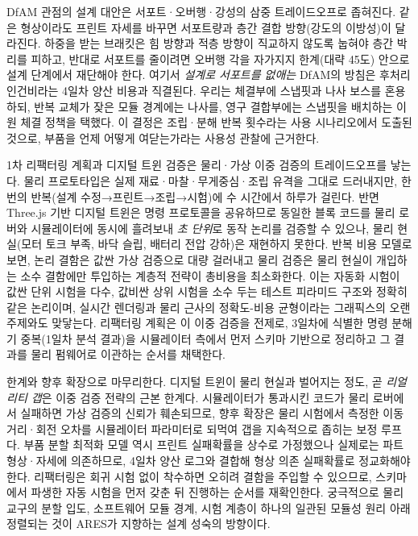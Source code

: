 DfAM 관점의 설계 대안은 서포트·오버행·강성의 삼중 트레이드오프로 좁혀진다. 같은 형상이라도 프린트 자세를 바꾸면 서포트량과 층간 결합 방향(강도의 이방성)이 달라진다. 하중을 받는 브래킷은 힘 방향과 적층 방향이 직교하지 않도록 눕혀야 층간 박리를 피하고, 반대로 서포트를 줄이려면 오버행 각을 자가지지 한계(대략 45도) 안으로 설계 단계에서 재단해야 한다. 여기서 \emph{설계로 서포트를 없애는} DfAM의 방침은 후처리 인건비라는 4일차 양산 비용과 직결된다. 우리는 체결부에 스냅핏과 나사 보스를 혼용하되, 반복 교체가 잦은 모듈 경계에는 나사를, 영구 결합부에는 스냅핏을 배치하는 이원 체결 정책을 택했다. 이 결정은 조립·분해 반복 횟수라는 사용 시나리오에서 도출된 것으로, 부품을 언제 어떻게 여닫는가라는 사용성 관찰\cite{norman2013design}에 근거한다.

1차 리팩터링 계획과 디지털 트윈 검증은 물리·가상 이중 검증의 트레이드오프를 낳는다. 물리 프로토타입은 실제 재료·마찰·무게중심·조립 유격을 그대로 드러내지만, 한 번의 반복(설계 수정→프린트→조립→시험)에 수 시간에서 하루가 걸린다. 반면 Three.js 기반 디지털 트윈\cite{threejs}은 명령 프로토콜을 공유하므로 동일한 블록 코드를 물리 로버와 시뮬레이터에 동시에 흘려보내 \emph{초 단위}로 동작 논리를 검증할 수 있으나, 물리 현실(모터 토크 부족, 바닥 슬립, 배터리 전압 강하)은 재현하지 못한다. 반복 비용 모델로 보면, 논리 결함은 값싼 가상 검증으로 대량 걸러내고 물리 검증은 물리 현실이 개입하는 소수 결함에만 투입하는 계층적 전략이 총비용을 최소화한다. 이는 자동화 시험이 값싼 단위 시험을 다수, 값비싼 상위 시험을 소수 두는 테스트 피라미드\cite{beck2003tdd} 구조와 정확히 같은 논리이며, 실시간 렌더링과 물리 근사의 정확도-비용 균형\cite{akenine2018realtime}이라는 그래픽스의 오랜 주제와도 맞닿는다. 리팩터링 계획은 이 이중 검증을 전제로, 3일차에 식별한 명령 분해기 중복(1일차 분석 결과)을 시뮬레이터 측에서 먼저 스키마 기반으로 정리하고 그 결과를 물리 펌웨어로 이관하는 순서를 채택한다.

한계와 향후 확장으로 마무리한다. 디지털 트윈이 물리 현실과 벌어지는 정도, 곧 \emph{리얼리티 갭}은 이중 검증 전략의 근본 한계다. 시뮬레이터가 통과시킨 코드가 물리 로버에서 실패하면 가상 검증의 신뢰가 훼손되므로, 향후 확장은 물리 시험에서 측정한 이동 거리·회전 오차를 시뮬레이터 파라미터로 되먹여 갭을 지속적으로 좁히는 보정 루프다. 부품 분할 최적화 모델 역시 프린트 실패확률을 상수로 가정했으나 실제로는 파트 형상·자세에 의존하므로, 4일차 양산 로그와 결합해 형상 의존 실패확률로 정교화해야 한다. 리팩터링은 회귀 시험 없이 착수하면 오히려 결함을 주입할 수 있으므로\cite{feathers2004legacy}, 스키마에서 파생한 자동 시험을 먼저 갖춘 뒤 진행하는 순서를 재확인한다. 궁극적으로 물리 교구의 분할 입도, 소프트웨어 모듈 경계, 시험 계층이 하나의 일관된 모듈성 원리 아래 정렬되는 것이 ARES가 지향하는 설계 성숙의 방향이다\cite{iso25010}.



